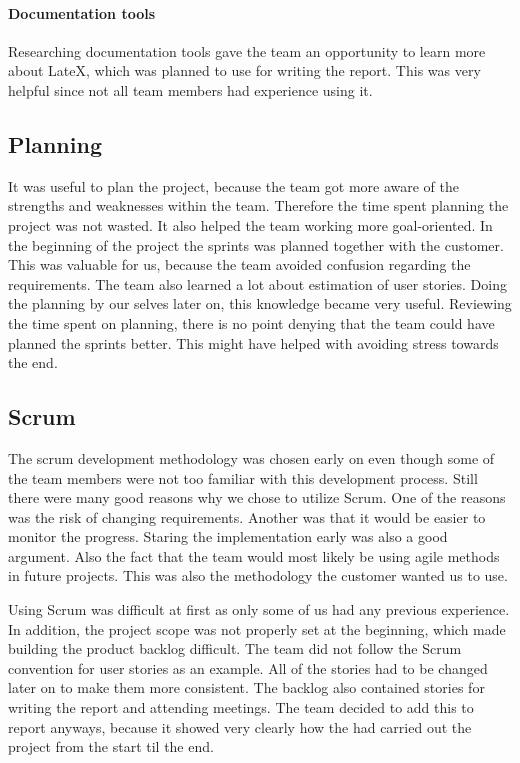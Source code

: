 \paragraph{Documentation tools}
Researching documentation tools gave the team an opportunity to learn more about LateX, which was planned to use for writing the report. This was very helpful since not all team members had experience using it. 

\subsection{Planning}

It was useful to plan the project, because the team got more aware of the strengths and weaknesses within the team. Therefore the time spent planning the project was not wasted. It also helped the team working more goal-oriented. In the beginning of the project the sprints was planned together with the customer. This was valuable for us, because the team avoided confusion regarding the requirements. The team also learned a lot about estimation of user stories. Doing the planning by our selves later on, this knowledge became very useful. Reviewing the time spent on planning, there is no point denying that the team could have planned the sprints better. This might have helped with avoiding stress towards the end.   

\subsection{Scrum}
The scrum development methodology was chosen early on even though some of the team members were not too familiar with this development process.
Still there were many good reasons why we chose to utilize Scrum.
One of the reasons was the risk of changing requirements.
Another was that it would be easier to monitor the progress. Staring the implementation early was also a good argument. Also the fact that the team would most likely be using agile methods in future projects. 
This was also the methodology the customer wanted us to use. 

Using Scrum was difficult at first as only some of us had any previous experience. 
In addition, the project scope was not properly set at the beginning, which made building the product backlog difficult. 
The team did not follow the Scrum convention for user stories as an example. 
All of the stories had to be changed later on to make them more consistent. 
The backlog also contained stories for writing the report and attending meetings.
The team decided to add this to report anyways, because it showed very clearly how the had carried out the project from the start til the end. 

